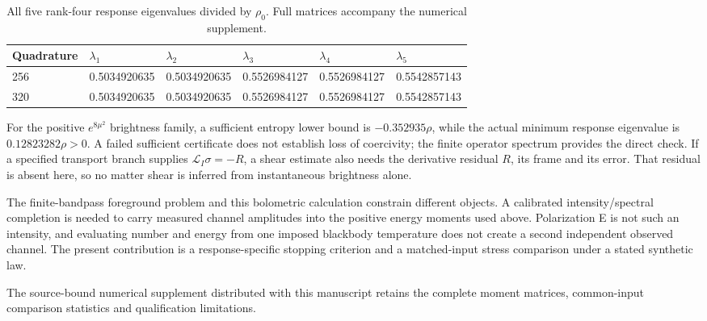 \documentclass[aps,prd,reprint,onecolumn,nofootinbib]{revtex4-2}
\begin{document}
\begin{table}[htbp]
\centering\small
\caption{All five rank-four response eigenvalues divided by $\rho_0$. Full matrices accompany the numerical supplement.}\label{tab:radeigen}
\begin{tabular}{llllll}
\toprule
Quadrature & $\lambda_1$ & $\lambda_2$ & $\lambda_3$ & $\lambda_4$ & $\lambda_5$ \\
\midrule
256 & 0.5034920635 & 0.5034920635 & 0.5526984127 & 0.5526984127 & 0.5542857143 \\
320 & 0.5034920635 & 0.5034920635 & 0.5526984127 & 0.5526984127 & 0.5542857143 \\
\bottomrule
\end{tabular}
\end{table}

For the positive \(e^{8\mu^2}\) brightness family, a sufficient entropy
lower bound is \(-0.352935\rho\), while the actual minimum response
eigenvalue is \(0.12823282\rho>0\). A failed sufficient certificate does
not establish loss of coercivity; the finite operator spectrum provides
the direct check. If a specified transport branch supplies
\(\mathcal L_I\sigma=-R\), a shear estimate also needs the derivative
residual \(R\), its frame and its error. That residual is absent here,
so no matter shear is inferred from instantaneous brightness alone.

The finite-bandpass foreground problem and this bolometric calculation
constrain different objects. A calibrated intensity/spectral completion
is needed to carry measured channel amplitudes into the positive energy
moments used above. Polarization E is not such an intensity, and
evaluating number and energy from one imposed blackbody temperature does
not create a second independent observed channel. The present
contribution is a response-specific stopping criterion and a
matched-input stress comparison under a stated synthetic law.

\begin{thebibliography}{1}
 The source-bound numerical supplement distributed with this manuscript retains the complete moment matrices, common-input comparison statistics and qualification limitations.
\end{thebibliography}
\end{document}
